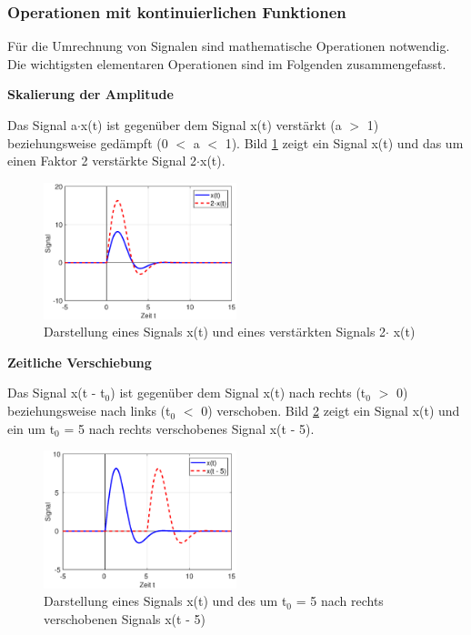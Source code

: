 \subsubsection{ Operationen mit kontinuierlichen Funktionen}

\noindent F\"{u}r die Umrechnung von Signalen sind mathematische Operationen notwendig. Die wichtigsten elementaren Operationen sind im Folgenden zusammengefasst. 

\bigskip

{\selectfont
\noindent\textbf{Skalierung der Amplitude}} \smallskip

\noindent Das Signal a$\cdot$x(t) ist gegen\"{u}ber dem Signal x(t) verst\"{a}rkt (a $\mathrm{>}$ 1) beziehungsweise ged\"{a}mpft (0 $\mathrm{<}$ a $\mathrm{<}$ 1). Bild \ref{fig:Skalierung} zeigt ein Signal x(t) und das um einen Faktor 2 verst\"{a}rkte Signal 2$\cdot$x(t).

\begin{figure}[H]
  \centerline{\includegraphics[width=0.5\textwidth]{Kapitel1/Bilder/image14}}
  \caption{Darstellung eines Signals x(t) und eines verst\"{a}rkten Signals 2$\cdot$ x(t)}
  \label{fig:Skalierung}
\end{figure}

\bigskip

{\selectfont
\noindent\textbf{Zeitliche Verschiebung}} \smallskip

\noindent Das Signal x(t - t${}_{0}$) ist gegen\"{u}ber dem Signal x(t) nach rechts (t${}_{0}$ $\mathrm{>}$ 0) beziehungsweise nach links (t${}_{0}$ $\mathrm{<}$ 0) verschoben. Bild \ref{fig:Verschiebung} zeigt ein Signal x(t) und ein um t${}_{0}$ = 5 nach rechts verschobenes Signal x(t - 5).

\begin{figure}[H]
  \centerline{\includegraphics[width=0.5\textwidth]{Kapitel1/Bilder/image15}}
  \caption{Darstellung eines Signals x(t) und des um t${}_{0}$ = 5 nach rechts verschobenen Signals x(t - 5)}
  \label{fig:Verschiebung}
\end{figure}

